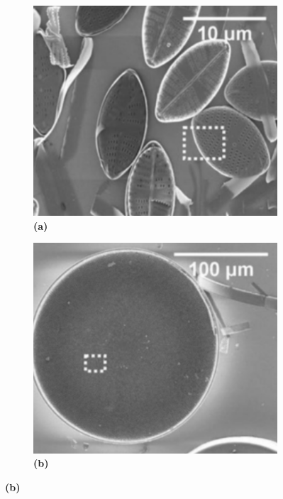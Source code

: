 \documentclass[10pt,aspectratio=1610,compress,dvipsnames]{beamer}
\begin{document}
\begin{frame}
{\begin{figure}
  \centering
  \begin{subfigure}[b]{0.2\linewidth}
    \includegraphics[width=0.9\linewidth]{Frustrulespictures/Screen Shot 2023-07-02 at 8.24.59 PM.png} %
    \caption*{\textbf{(a)}}
    \label{fig7:a}
  \end{subfigure}\hspace{0.5cm} %
  \begin{subfigure}[b]{0.2\linewidth}
    \includegraphics[width=0.9\linewidth]{Frustrulespictures/Screen Shot 2023-07-02 at 8.25.32 PM.png} %
    \caption*{\textbf{(b)}}
    \label{fig7:b}
  \end{subfigure}


\end{figure}}
\end{frame}
\end{document}
